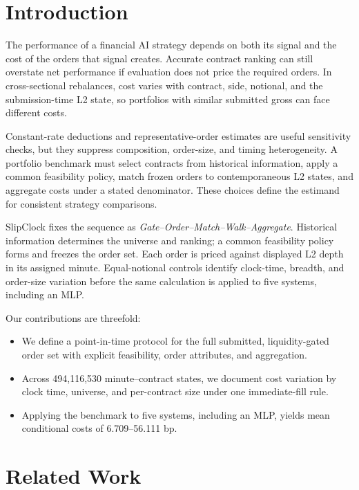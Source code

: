 \documentclass[sigconf]{acmart}
\begin{document}
\maketitle

\section{Introduction}
The performance of a financial AI strategy depends on both its signal and the cost of the orders that signal creates. Accurate contract ranking can still overstate net performance if evaluation does not price the required orders. In cross-sectional rebalances, cost varies with contract, side, notional, and the submission-time L2 state, so portfolios with similar submitted gross can face different costs.

Constant-rate deductions and representative-order estimates are useful sensitivity checks, but they suppress composition, order-size, and timing heterogeneity. A portfolio benchmark must select contracts from historical information, apply a common feasibility policy, match frozen orders to contemporaneous L2 states, and aggregate costs under a stated denominator. These choices define the estimand for consistent strategy comparisons.

SlipClock fixes the sequence as \emph{Gate--Order--Match--Walk--Aggregate}. Historical information determines the universe and ranking; a common feasibility policy forms and freezes the order set. Each order is priced against displayed L2 depth in its assigned minute. Equal-notional controls identify clock-time, breadth, and order-size variation before the same calculation is applied to five systems, including an MLP.

Our contributions are threefold:
\begin{itemize}
\item We define a point-in-time protocol for the full submitted, liquidity-gated order set with explicit feasibility, order attributes, and aggregation.
\item Across 494,116,530 minute--contract states, we document cost variation by clock time, universe, and per-contract size under one immediate-fill rule.
\item Applying the benchmark to five systems, including an MLP, yields mean conditional costs of 6.709--56.111 bp.
\end{itemize}

\section{Related Work}
\end{document}
